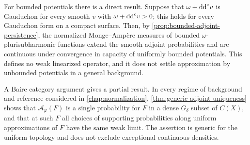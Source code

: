 For bounded potentials there is a direct result. Suppose that $\omega+\mathrm{dd}^{\mathrm{c}} v$ is Gauduchon for every smooth $v$ with $\omega+\mathrm{dd}^{\mathrm{c}} v>0$; this holds for every Gauduchon form on a compact surface. Then, by \cref{prop:bounded-adjoint-persistence}, the normalized Monge--Amp\`ere measures of bounded $\omega$-plurisubharmonic functions extend the smooth adjoint probabilities and are continuous under convergence in capacity of uniformly bounded potentials. This defines no weak linearized operator, and it does not settle approximation by unbounded potentials in a general background.

A Baire category argument gives a partial result. In every regime of background and reference considered in \cref{chap:normalization}, \cref{thm:generic-adjoint-uniqueness} shows that $\mathcal A_\varphi(F)$ is a single probability for $F$ in a dense $G_\delta$ subset of $C(X)$, and that at such $F$ all choices of supporting probabilities along uniform approximations of $F$ have the same weak limit. The assertion is generic for the uniform topology and does not exclude exceptional continuous densities.

